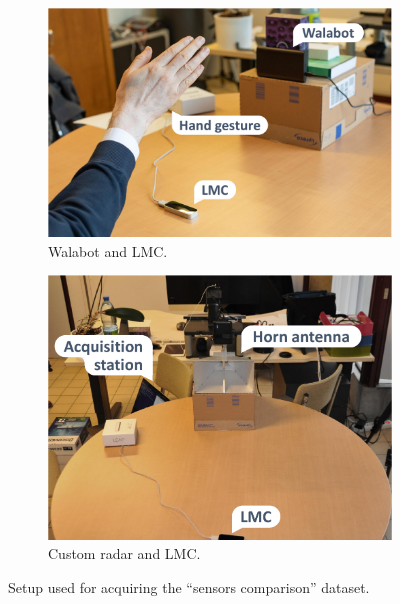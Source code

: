 \begin{figure}[t]
    \centering
    \begin{subfigure}{.53\linewidth}
        \centering
        \includegraphics[width=\linewidth]{Figures/RadarExperiments/Datasets/SensorsComparison/setup-walabot-lmc.pdf}
        \captionsetup{width=.99\linewidth}
        \caption{Walabot and LMC.}
        \label{fig:radar-experiments:setup-sensors-comparison:walabot-lmc}
    \end{subfigure}
    \begin{subfigure}{.46\linewidth}
        \centering
        \includegraphics[width=\linewidth]{Figures/RadarExperiments/Datasets/SensorsComparison/setup-horn-lmc.pdf}
        \captionsetup{width=.99\linewidth}
        \caption{Custom radar and LMC.}
        \label{fig:radar-experiments:setup-sensors-comparison:horn-lmc}
    \end{subfigure}
    \caption{Setup used for acquiring the ``sensors comparison'' dataset.}
    \label{fig:radar-experiments:setup-sensors-comparison}
\end{figure}

